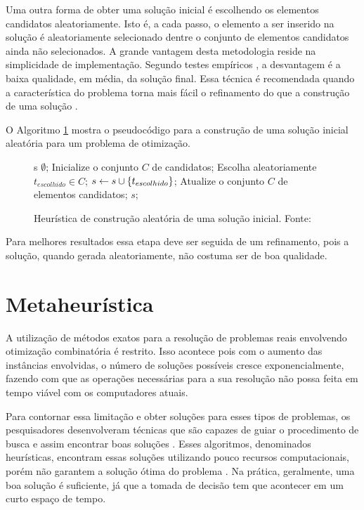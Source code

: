 Uma outra forma de obter uma solução inicial é escolhendo os elementos candidatos aleatoriamente. Isto é, a cada passo, o elemento a ser inserido na solução é aleatoriamente selecionado dentre o conjunto de elementos candidatos ainda não selecionados. A grande vantagem desta metodologia reside na simplicidade de implementação. Segundo testes empíricos , a desvantagem é a baixa qualidade, em média, da solução final. Essa técnica é recomendada quando a característica do problema torna mais fácil o refinamento do que a construção de uma solução \citep{notasmarcone}. 

O Algoritmo \ref{alg:heurconsaleatoria} mostra o pseudocódigo para a construção de uma solução inicial aleatória para um problema de otimização.

\begin{figure}[h]
\caption{Heurística de construção aleatória de uma solução
inicial. \mbox{Fonte: \cite{notasmarcone}}}\label{alg:heurconsaleatoria}
\begin{programma}
\STATE s \GETS $\emptyset$;
\STATE Inicialize o conjunto $C$ de candidatos;
\STATE Escolha aleatoriamente $t_{escolhido} \in C$;
\STATE $s \leftarrow s \cup \{t_{escolhido}\}$;
\STATE Atualize o conjunto $C$ de elementos candidatos;
\ENDWHILE
\STATE\RETURN $s$;
\ENDALGORITHM
\end{programma}
\end{figure}

Para melhores resultados essa etapa deve ser seguida de um refinamento, pois a solução, quando gerada aleatoriamente, não costuma ser de boa qualidade.

\section{Metaheurística}

A utilização de métodos exatos para a resolução de problemas reais envolvendo otimização combinatória é restrito. Isso acontece pois com o aumento das instâncias envolvidas, o número de soluções possíveis cresce exponencialmente, fazendo com que as operações necessárias para a sua resolução não possa feita em tempo viável com os computadores atuais.  

Para contornar essa limitação e obter soluções para esses tipos de problemas, os pesquisadores desenvolveram técnicas que são capazes de guiar o procedimento de busca e assim encontrar boas soluções \cite{maritan2009}. Esses algoritmos, denominados heurísticas, encontram essas soluções utilizando pouco recursos computacionais, porém não garantem a solução ótima do problema \cite{dias2006}. Na prática, geralmente, uma boa solução é suficiente, já que a tomada de decisão tem que acontecer em um curto espaço de tempo.

